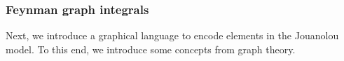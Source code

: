 \documentclass[11pt]{amsart}
\theoremstyle{definition}
\theoremstyle{remark}
\numberwithin{equation}{section}
\begin{document}
\subsubsection{Feynman graph integrals}
Next, we introduce a graphical language to encode elements in the Jouanolou model.
To this end, we introduce some concepts from graph theory.
%
\end{document}
